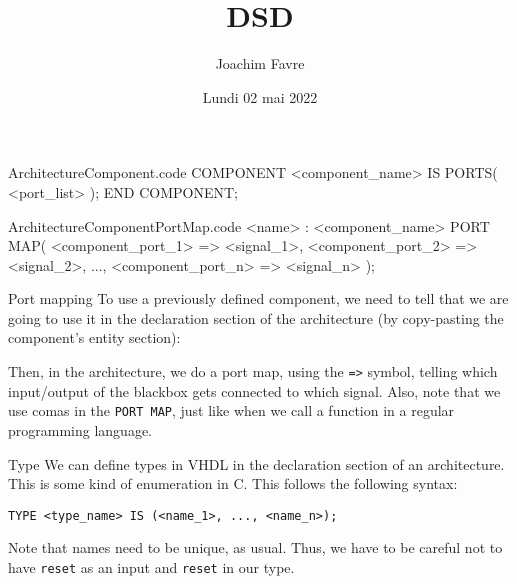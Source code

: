 \documentclass[a4paper]{article}
\title{DSD}
\author{Joachim Favre}
\date{Lundi 02 mai 2022}
\begin{document}
\maketitle



\begin{filecontents*}[overwrite]{ArchitectureComponent.code}
COMPONENT <component_name> IS
    PORTS(
        <port_list>
    );
END COMPONENT;
\end{filecontents*}

\begin{filecontents*}[overwrite]{ArchitectureComponentPortMap.code}
<name> : <component_name>
PORT MAP(
    <component_port_1> => <signal_1>,
    <component_port_2> => <signal_2>,
    ...,
    <component_port_n> => <signal_n>
);
\end{filecontents*}

\begin{parag}{Port mapping}
    To use a previously defined component, we need to tell that we are going to use it in the declaration section of the architecture (by copy-pasting the component's entity section): 

    Then, in the architecture, we do a port map, using the \texttt{=>} symbol, telling which input/output of the blackbox gets connected to which signal. Also, note that we use comas in the \texttt{PORT MAP}, just like when we call a function in a regular programming language.
\end{parag}

\begin{parag}{Type}
    We can define types in VHDL in the declaration section of an architecture. This is some kind of enumeration in C. This follows the following syntax: 
    \begin{center}
        \texttt{TYPE <type\_name> IS (<name\_1>, ..., <name\_n>);}
    \end{center}

    Note that names need to be unique, as usual. Thus, we have to be careful not to have \texttt{reset} as an input and \texttt{reset} in our type.
\end{parag}
\end{document}
